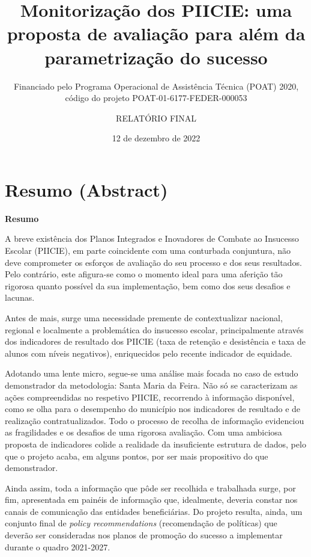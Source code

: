 \documentclass[
]{book}
\title{Monitorização dos PIICIE: uma proposta de avaliação para além da parametrização do sucesso}
\subtitle{Financiado pelo Programa Operacional de Assistência Técnica (POAT) 2020, código do projeto POAT-01-6177-FEDER-000053}
\author{RELATÓRIO FINAL}
\date{12 de dezembro de 2022}
\begin{document}
\maketitle

{
\setcounter{tocdepth}{1}
\tableofcontents
}
\hypertarget{resumo-abstract}{%
\chapter*{\texorpdfstring{\textbf{Resumo (Abstract)}}{Resumo (Abstract)}}\label{resumo-abstract}}

\textbf{Resumo}

A breve existência dos Planos Integrados e Inovadores de Combate ao Insucesso Escolar (PIICIE), em parte coincidente com uma conturbada conjuntura, não deve comprometer os esforços de avaliação do seu processo e dos seus resultados. Pelo contrário, este afigura-se como o momento ideal para uma aferição tão rigorosa quanto possível da sua implementação, bem como dos seus desafios e lacunas.

Antes de mais, surge uma necessidade premente de contextualizar nacional, regional e localmente a problemática do insucesso escolar, principalmente através dos indicadores de resultado dos PIICIE (taxa de retenção e desistência e taxa de alunos com níveis negativos), enriquecidos pelo recente indicador de equidade.

Adotando uma lente micro, segue-se uma análise mais focada no caso de estudo demonstrador da metodologia: Santa Maria da Feira. Não só se caracterizam as ações compreendidas no respetivo PIICIE, recorrendo à informação disponível, como se olha para o desempenho do município nos indicadores de resultado e de realização contratualizados. Todo o processo de recolha de informação evidenciou as fragilidades e os desafios de uma rigorosa avaliação. Com uma ambiciosa proposta de indicadores colide a realidade da insuficiente estrutura de dados, pelo que o projeto acaba, em alguns pontos, por ser mais propositivo do que demonstrador.

Ainda assim, toda a informação que pôde ser recolhida e trabalhada surge, por fim, apresentada em painéis de informação que, idealmente, deveria constar nos canais de comunicação das entidades beneficiárias. Do projeto resulta, ainda, um conjunto final de \emph{policy recommendations} (recomendação de políticas) que deverão ser consideradas nos planos de promoção do sucesso a implementar durante o quadro 2021-2027.
\end{document}
